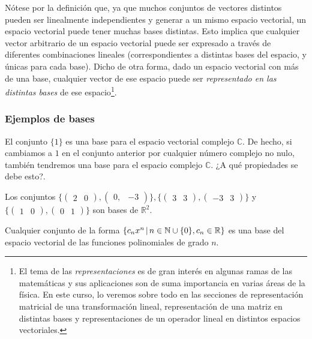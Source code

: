 \documentclass[notasLineal]{subfiles}
\begin{document}
Nótese por la definición que, ya que muchos conjuntos de vectores distintos pueden ser linealmente independientes y generar a un mismo espacio vectorial, un espacio vectorial puede tener muchas bases distintas. Esto implica que cualquier vector arbitrario de un espacio vectorial puede ser expresado a través de diferentes combinaciones lineales (correspondientes a distintas bases del espacio, y únicas para cada base). Dicho de otra forma, dado un espacio vectorial con más de una base, cualquier vector de ese espacio puede ser \emph{representado en las distintas bases} de ese espacio\footnote{El tema de las \emph{representaciones} es de gran interés en algunas ramas de las matemáticas y sus aplicaciones son de suma importancia en varias áreas de la física. En este curso, lo veremos sobre todo en las secciones de representación matricial de una transformación lineal, representación de una matriz en distintas bases y representaciones de un operador lineal en distintos espacios vectoriales.}.

\subsubsection*{Ejemplos de bases} \label{Ejem:Bases}

El conjunto $\{1\}$ es una base para el espacio vectorial complejo $\mathbb{C}.$ De hecho, si cambiamos a $1$ en el conjunto anterior por cualquier número complejo no nulo, también tendremos una base para el espacio complejo $\mathbb{C}$. ¿A qué propiedades se debe esto?. 
\vspace{3mm}

Los conjuntos $\{\begin{pmatrix} 2 & 0 \end{pmatrix}, \begin{pmatrix} 0, & -3 \end{pmatrix}\}, \{\begin{pmatrix} 3 & 3 \end{pmatrix}, \begin{pmatrix} -3 & 3 \end{pmatrix}\}$ y $\{\begin{pmatrix} 1 & 0 \end{pmatrix},\begin{pmatrix} 0 & 1 \end{pmatrix}\}$ son bases de $\mathbb{R}^2$.
\vspace{3mm}

Cualquier conjunto de la forma $\{c_n x^n\hspace{0.5mm}|\hspace{0.5mm}n\in\mathbb{N}\cup\{0\}, c_n\in \mathbb{R}\}$ es una base del espacio vectorial de las funciones polinomiales de grado $n$.
\end{document}
